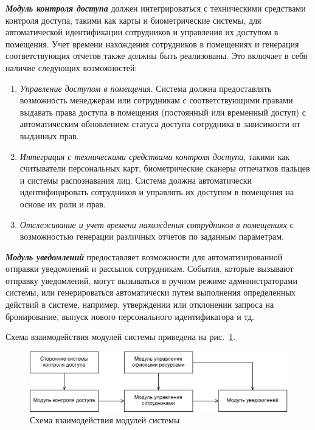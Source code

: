 \textit{\textbf{Модуль контроля доступа}} должен интегрироваться с техническими средствами контроля доступа, такими как карты и биометрические системы, для автоматической идентификации сотрудников и управления их доступом в помещения. Учет времени нахождения сотрудников в помещениях и генерация соответствующих отчетов также должны быть реализованы. Это включает в себя наличие следующих возможностей:

\begin{enumerate}
    \item \textit{Управление доступом в помещения}. Система должна предоставлять возможность менеджерам или сотрудникам с соответствующими правами выдавать права доступа в помещения (постоянный или временный доступ) с автоматическим обновлением статуса доступа сотрудника в зависимости от выданных прав.

    \item \textit{Интеграция с техническими средствами контроля доступа}, такими как считыватели персональных карт, биометрические сканеры отпечатков пальцев и системы распознавания лиц. Система должна автоматически идентифицировать сотрудников и управлять их доступом в помещения на основе их роли и прав.

    \item \textit{Отслеживание и учет времени нахождения сотрудников в помещениях} с возможностью генерации различных отчетов по заданным параметрам.
\end{enumerate}


\textit{\textbf{Модуль уведомлений}} предоставляет возможности для автоматизированной отправки уведомлений и рассылок сотрудникам. События, которые вызывают отправку уведомлений, могут вызываться в ручном режиме администраторами системы, или генерироваться автоматически путем выполнения определенных действий в системе, например, утверждении или отклонении запроса на бронирование, выпуск нового персонального идентификатора и тд.

Схема взаимодействия модулей системы приведена на рис.~\ref{fig:tech-requirements:functional-requirements:schema-of-modules}.

\begin{figure}[h]
\centering
    \includegraphics[width=0.9\linewidth]{assets/schema-of-modules.png}
    \caption{Схема взаимодействия модулей системы}
    \label{fig:tech-requirements:functional-requirements:schema-of-modules}
\end{figure}
